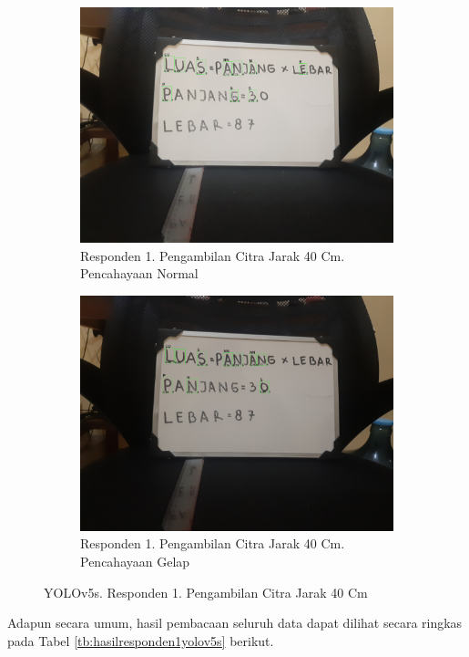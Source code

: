 \begin{figure}[H]
  \begin{subfigure}{.5\textwidth}
    \centering
    \captionsetup{width=.8\linewidth}
    \includegraphics[width=.8\linewidth]{gambar/yolov5s/responden1/dinda40cm00-result.jpg}
    \caption{Responden 1. Pengambilan Citra Jarak 40 Cm. Pencahayaan Normal}
    \label{fig:sr1tcitra40cm}
  \end{subfigure}%
  \begin{subfigure}{.5\textwidth}
    \centering
    \captionsetup{width=.8\linewidth}
    \includegraphics[width=.8\linewidth]{gambar/yolov5s/responden1/dinda40cm10-result.jpg}
    \caption{Responden 1. Pengambilan Citra Jarak 40 Cm. Pencahayaan Gelap}
    \label{fig:sr1gcitra40cm}
  \end{subfigure}
  \caption{YOLOv5s. Responden 1. Pengambilan Citra Jarak 40 Cm}
  \label{fig:sr1citra40cm}
\end{figure}

Adapun secara umum, hasil pembacaan seluruh data dapat dilihat secara ringkas pada Tabel \ref*{tb:hasilresponden1yolov5s} berikut.

